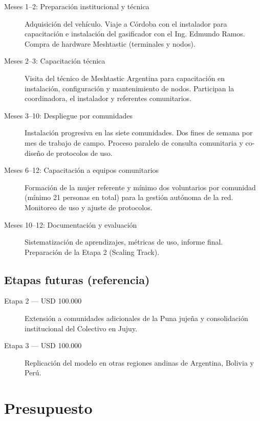 \documentclass[12pt,a4paper]{article}
\begin{document}
\begin{description}
  \item[Meses 1--2: Preparación institucional y técnica]
    Adquisición del vehículo. Viaje a Córdoba con el instalador para capacitación e instalación del gasificador con el Ing. Edmundo Ramos. Compra de hardware Meshtastic (terminales y nodos).

  \item[Meses 2--3: Capacitación técnica]
    Visita del técnico de Meshtastic Argentina para capacitación en instalación, configuración y mantenimiento de nodos. Participan la coordinadora, el instalador y referentes comunitarios.

  \item[Meses 3--10: Despliegue por comunidades]
    Instalación progresiva en las siete comunidades. Dos fines de semana por mes de trabajo de campo. Proceso paralelo de consulta comunitaria y co-diseño de protocolos de uso.

  \item[Meses 6--12: Capacitación a equipos comunitarios]
    Formación de la mujer referente y mínimo dos voluntarios por comunidad (mínimo 21 personas en total) para la gestión autónoma de la red. Monitoreo de uso y ajuste de protocolos.

  \item[Meses 10--12: Documentación y evaluación]
    Sistematización de aprendizajes, métricas de uso, informe final. Preparación de la Etapa 2 (Scaling Track).
\end{description}

\subsection{Etapas futuras (referencia)}

\begin{description}
  \item[Etapa 2 --- USD 100.000] Extensión a comunidades adicionales de la Puna jujeña y consolidación institucional del Colectivo en Jujuy.
  \item[Etapa 3 --- USD 100.000] Replicación del modelo en otras regiones andinas de Argentina, Bolivia y Perú.
\end{description}

\section{Presupuesto}
\end{document}
